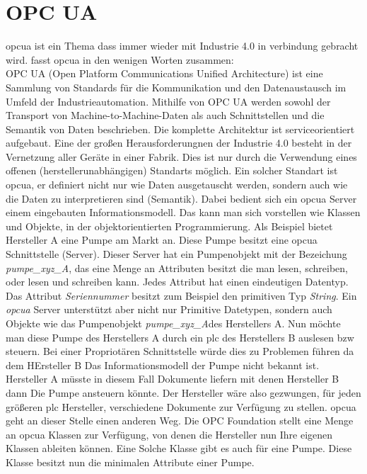 \section{OPC UA}
\ac{opcua} ist ein Thema dass immer wieder mit Industrie 4.0 in verbindung gebracht wird.
\citet{opcua:2018} fasst \acs{opcua} in den wenigen  Worten zusammen:\\
\glqq OPC UA (Open Platform Communications Unified Architecture) ist eine Sammlung von Standards 
für die Kommunikation und den Datenaustausch im Umfeld der Industrieautomation. 
Mithilfe von OPC UA werden sowohl der Transport von Machine-to-Machine-Daten 
als auch Schnittstellen und die Semantik von Daten beschrieben. 
Die komplette Architektur ist serviceorientiert aufgebaut.\grqq
Eine der großen Herausforderungnen der Industrie 4.0 besteht in der Vernetzung aller Geräte in einer Fabrik.
Dies ist nur durch die Verwendung eines offenen (herstellerunabhängigen) Standarts möglich.
Ein solcher Standart ist \ac{opcua}, er definiert nicht nur wie Daten ausgetauscht werden, 
sondern auch wie die Daten zu interpretieren sind (Semantik).
Dabei bedient sich ein \ac{opcua} Server einem eingebauten Informationsmodell. 
Das kann man sich vorstellen wie Klassen und Objekte, in der objektorientierten Programmierung.
Als Beispiel bietet Hersteller A eine Pumpe am Markt an. 
Diese Pumpe besitzt eine \ac{opcua} Schnittstelle (Server).
Dieser Server hat ein Pumpenobjekt mit der Bezeichung \glqq \emph{pumpe\_xyz\_A}\grqq, das eine Menge an Attributen besitzt die man lesen, schreiben, oder lesen und schreiben kann.
Jedes Attribut hat einen eindeutigen Datentyp. 
Das Attribut \emph{Seriennummer} besitzt zum Beispiel den primitiven Typ \emph{String}.
Ein \emph{opcua} Server unterstützt aber nicht nur Primitive Datetypen, 
sondern auch Objekte wie das Pumpenobjekt \glqq \emph{pumpe\_xyz\_A}\grqq{}des Herstellers A.
Nun möchte man diese Pumpe des Herstellers A durch ein \ac{plc} des Herstellers B auslesen bzw steuern.
Bei einer Propriotären Schnittstelle würde dies zu Problemen führen da dem HErsteller B Das Informationsmodell der Pumpe nicht bekannt ist. 
Hersteller A müsste in diesem Fall Dokumente liefern mit denen Hersteller B dann Die Pumpe ansteuern könnte.
Der Hersteller wäre also gezwungen, für jeden größeren \ac{plc} Hersteller, verschiedene Dokumente zur Verfügung zu stellen.
\ac{opcua} geht an dieser Stelle einen anderen Weg. 
Die OPC Foundation stellt eine Menge an \ac{opcua} Klassen zur Verfügung, 
von denen die Hersteller nun Ihre eigenen Klassen ableiten können.
Eine Solche Klasse gibt es auch für eine Pumpe. Diese Klasse besitzt nun die minimalen Attribute einer Pumpe.
